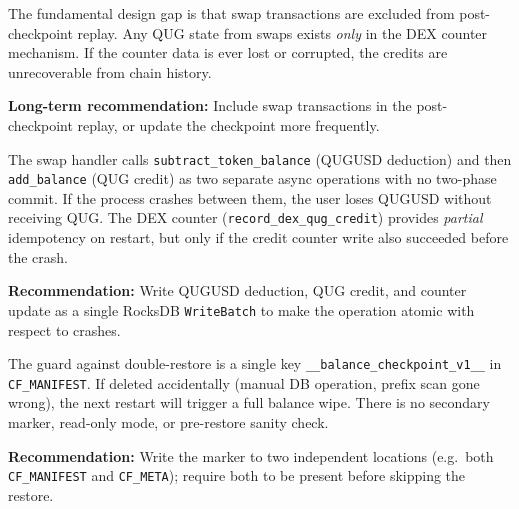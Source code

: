 \documentclass[11pt,a4paper]{article}
\begin{document}
\medskip

\begin{infobox}
The fundamental design gap is that swap transactions are excluded from
post-checkpoint replay.  Any QUG state from swaps exists \emph{only} in the
DEX counter mechanism.  If the counter data is ever lost or corrupted, the
credits are unrecoverable from chain history.

\textbf{Long-term recommendation:} Include swap transactions in the
post-checkpoint replay, or update the checkpoint more frequently.
\end{infobox}

\medskip

\begin{noticebox}
The swap handler calls \texttt{subtract\_token\_balance} (QUGUSD deduction) and
then \texttt{add\_balance} (QUG credit) as two separate async operations with no
two-phase commit.  If the process crashes between them, the user loses QUGUSD
without receiving QUG.  The DEX counter
(\texttt{record\_dex\_qug\_credit}) provides \emph{partial} idempotency on
restart, but only if the credit counter write also succeeded before the crash.

\textbf{Recommendation:} Write QUGUSD deduction, QUG credit, and counter update
as a single RocksDB \texttt{WriteBatch} to make the operation atomic with
respect to crashes.
\end{noticebox}

\medskip

\begin{noticebox}
The guard against double-restore is a single key
\texttt{\_\_balance\_checkpoint\_v1\_\_} in \texttt{CF\_MANIFEST}.  If deleted
accidentally (manual DB operation, prefix scan gone wrong), the next restart will
trigger a full balance wipe.  There is no secondary marker, read-only mode, or
pre-restore sanity check.

\textbf{Recommendation:} Write the marker to two independent locations (e.g.\
both \texttt{CF\_MANIFEST} and \texttt{CF\_META}); require both to be present
before skipping the restore.
\end{noticebox}

\medskip
\end{document}
